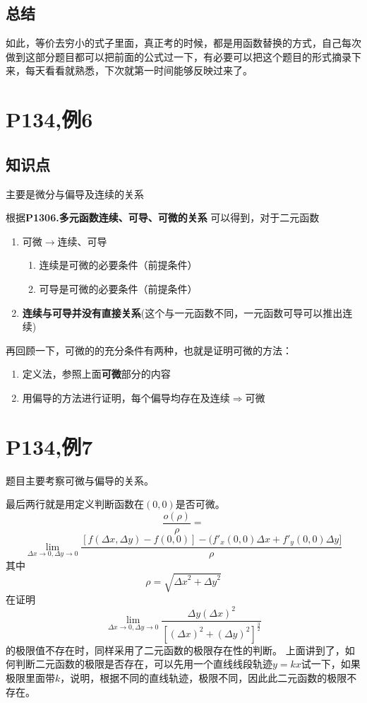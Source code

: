 \documentclass[a4paper]{ctexart}
\begin{document}
\begin{multicols}{2}
\subsection{总结}
如此，等价去穷小的式子里面，真正考的时候，都是用函数替换的方式，自己每次做到这部分题目都可以把前面的公式过一下，有必要可以把这个题目的形式摘录下来，每天看看就熟悉，下次就第一时间能够反映过来了。

\section{P134,例6}
\subsection{知识点}
\par 
主要是微分与偏导及连续的关系
\par
根据\textbf{P130\quad6.多元函数连续、可导、可微的关系}
可以得到，对于二元函数
\begin{enumerate}
    \item 可微$\rightarrow$连续、可导
        \begin{enumerate}
            \item 连续是可微的必要条件（前提条件）
            \item 可导是可微的必要条件（前提条件）
        \end{enumerate}
    \item \textbf{连续与可导并没有直接关系}(这个与一元函数不同，一元函数可导可以推出连续)
\end{enumerate}
\par
再回顾一下，可微的的充分条件有两种，也就是证明可微的方法：

\begin{enumerate}
    \item 定义法，参照上面\textbf{可微}部分的内容
    \item 用偏导的方法进行证明，每个偏导均存在及连续$\Rightarrow$可微
\end{enumerate}


\section{P134,例7}
\par
题目主要考察可微与偏导的关系。 
\par
最后两行就是用定义判断函数在$(0,0)$是否可微。
$$
\frac{o(\rho)}{\rho}
=
$$
$$
\lim_{\Delta x\rightarrow 0, \Delta y\rightarrow 0}
{
    \frac{
        [f(\Delta x,\Delta y) - f(0,0)] - (f'_x(0,0)\Delta x + f'_y(0,0)\Delta y] 
    }
    {\rho}
}
$$
其中
$$
\rho = \sqrt{
    {\Delta x}^2
    +
    {\Delta y}^2
}
$$
在证明
$$
\lim_{\Delta x\rightarrow 0, \Delta y\rightarrow 0}
{
    \frac{\Delta y(\Delta x)^2}
    {
        [(\Delta x)^2 + (\Delta y)^2]^{\frac{3}{2}}
    }
}
$$
的极限值不存在时，同样采用了二元函数的极限存在性的判断。
上面讲到了，如何判断二元函数的极限是否存在，可以先用一个直线线段轨迹$y=kx$试一下，如果极限里面带$k$，说明，根据不同的直线轨迹，极限不同，因此此二元函数的极限不存在。
\end{multicols}
\end{document}
